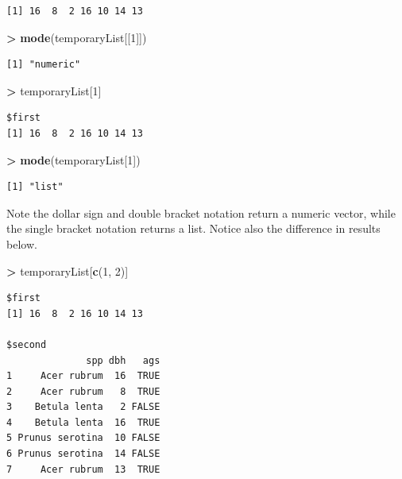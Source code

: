 \documentclass[]{krantz}
\makeatletter
\newenvironment{Shaded}{\begin{snugshade}}{\end{snugshade}}
\newcommand{\DecValTok}[1]{\textcolor[rgb]{0.06,0.06,0.06}{#1}}
\newcommand{\KeywordTok}[1]{\textcolor[rgb]{0.27,0.27,0.27}{\textbf{#1}}}
\newcommand{\NormalTok}[1]{#1}
\newcommand{\OperatorTok}[1]{\textcolor[rgb]{0.43,0.43,0.43}{\textbf{#1}}}
\newcommand{\StringTok}[1]{\textcolor[rgb]{0.5,0.5,0.5}{#1}}
\newenvironment{kframe}{%
\medskip{}
\setlength{\fboxsep}{.8em}
 \def\at@end@of@kframe{}%
 \ifinner\ifhmode%
  \def\at@end@of@kframe{\end{minipage}}%
  \begin{minipage}{\columnwidth}%
 \fi\fi%
 \def\FrameCommand##1{\hskip\@totalleftmargin \hskip-\fboxsep
 \colorbox{shadecolor}{##1}\hskip-\fboxsep
     \hskip-\linewidth \hskip-\@totalleftmargin \hskip\columnwidth}%
 \MakeFramed {\advance\hsize-\width
   \@totalleftmargin\z@ \linewidth\hsize
   \@setminipage}}%
 {\par\unskip\endMakeFramed%
 \at@end@of@kframe}
\renewenvironment{Shaded}{\begin{kframe}}{\end{kframe}}
\makeatother
\begin{document}
\begin{verbatim}
[1] 16  8  2 16 10 14 13
\end{verbatim}

\begin{Shaded}
\begin{Highlighting}[]
\OperatorTok{>}\StringTok{ }\KeywordTok{mode}\NormalTok{(temporaryList[[}\DecValTok{1}\NormalTok{]])}
\end{Highlighting}
\end{Shaded}

\begin{verbatim}
[1] "numeric"
\end{verbatim}

\begin{Shaded}
\begin{Highlighting}[]
\OperatorTok{>}\StringTok{ }\NormalTok{temporaryList[}\DecValTok{1}\NormalTok{]}
\end{Highlighting}
\end{Shaded}

\begin{verbatim}
$first
[1] 16  8  2 16 10 14 13
\end{verbatim}

\begin{Shaded}
\begin{Highlighting}[]
\OperatorTok{>}\StringTok{ }\KeywordTok{mode}\NormalTok{(temporaryList[}\DecValTok{1}\NormalTok{])}
\end{Highlighting}
\end{Shaded}

\begin{verbatim}
[1] "list"
\end{verbatim}

Note the dollar sign and double bracket notation return a numeric vector, while the single bracket notation returns a list. Notice also the difference in results below.

\begin{Shaded}
\begin{Highlighting}[]
\OperatorTok{>}\StringTok{ }\NormalTok{temporaryList[}\KeywordTok{c}\NormalTok{(}\DecValTok{1}\NormalTok{, }\DecValTok{2}\NormalTok{)]}
\end{Highlighting}
\end{Shaded}

\begin{verbatim}
$first
[1] 16  8  2 16 10 14 13

$second
              spp dbh   ags
1     Acer rubrum  16  TRUE
2     Acer rubrum   8  TRUE
3    Betula lenta   2 FALSE
4    Betula lenta  16  TRUE
5 Prunus serotina  10 FALSE
6 Prunus serotina  14 FALSE
7     Acer rubrum  13  TRUE
\end{verbatim}
\end{document}
